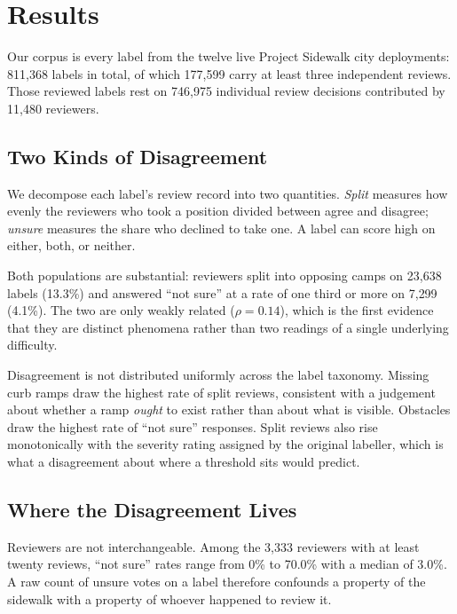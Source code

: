 
\section{Results}
\label{sec:results}

Our corpus is every label from the twelve live Project Sidewalk city
deployments: 811{,}368 labels in total, of which 177{,}599 carry at least three
independent reviews. Those reviewed labels rest on 746{,}975 individual review
decisions contributed by 11{,}480 reviewers.

\subsection{Two Kinds of Disagreement}

We decompose each label's review record into two quantities. \emph{Split}
measures how evenly the reviewers who took a position divided between agree and
disagree; \emph{unsure} measures the share who declined to take one. A label can
score high on either, both, or neither.

Both populations are substantial: reviewers split into opposing camps on
23{,}638 labels (13.3\%) and answered ``not sure'' at a rate of one third or
more on 7{,}299 (4.1\%). The two are only weakly related
($\rho = 0.14$), which is the first evidence that they are distinct phenomena
rather than two readings of a single underlying difficulty.

Disagreement is not distributed uniformly across the label taxonomy. Missing
curb ramps draw the highest rate of split reviews, consistent with a judgement
about whether a ramp \emph{ought} to exist rather than about what is visible.
Obstacles draw the highest rate of ``not sure'' responses. Split reviews also
rise monotonically with the severity rating assigned by the original labeller,
which is what a disagreement about where a threshold sits would predict.

\subsection{Where the Disagreement Lives}

Reviewers are not interchangeable. Among the 3{,}333 reviewers with at least
twenty reviews, ``not sure'' rates range from 0\% to 70.0\% with a median of
3.0\%. A raw count of unsure votes on a label therefore confounds a property of
the sidewalk with a property of whoever happened to review it.

